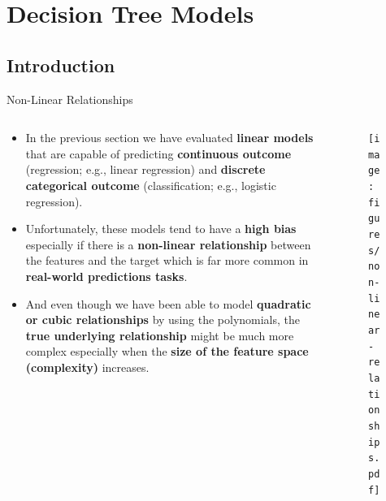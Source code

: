 \documentclass[document.tex]{subfiles}
\begin{document}
    \section{Decision Tree Models}
    
    \subsection{Introduction}
    
    \begin{frame}{Non-Linear Relationships}
        \begin{columns}
            \begin{column}{0.6\textwidth}
                \begin{itemize}
                    \item In the previous section we have evaluated \textbf{linear models} that are capable of predicting \textbf{continuous outcome} (regression; e.g., linear regression) and \textbf{discrete categorical outcome} (classification; e.g., logistic regression).
                    \item Unfortunately, these models tend to have a \textbf{high bias} especially if there is a \textbf{non-linear relationship} between the features and the target which is far more common in \textbf{real-world predictions tasks}.
                    \item And even though we have been able to model \textbf{quadratic or cubic relationships} by using the polynomials, the \textbf{true underlying relationship} might be much more complex especially when the \textbf{size of the feature space (complexity)} increases.
                \end{itemize}
            \end{column}
            \begin{column}{0.4\textwidth}
                \begin{figure}
                    \label{fig:non-linear-relationships}
                    \texttt{[image: figures/non-linear-relationships.pdf]}
                \end{figure}
            \end{column}
        \end{columns}
    \end{frame}
\end{document}
